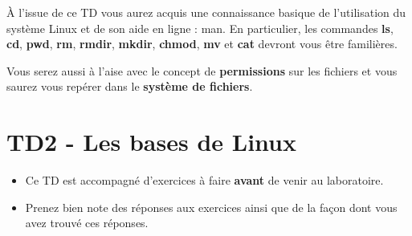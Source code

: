 \documentclass[a4paper,11pt]{article}
\date{2018 -- 2019}
\begin{document}
\entete
\titre
{}
\lastedit


	\begin{tcolorbox}[blanker,
	before skip=10mm,after skip=10mm,
	borderline west={1mm}{-4mm}{lightgray},
	title=Objectifs, coltitle=black, fonttitle=\sffamily\bfseries\large]
	\`A l'issue de ce TD vous aurez acquis une connaissance basique de l'utilisation du syst\`eme Linux 
	et de son aide en ligne : man.   
	En particulier, les commandes \textbf{ls}, 
	\textbf{cd}, \textbf{pwd}, 
	\textbf{rm}, \textbf{rmdir}, 
	\textbf{mkdir}, \textbf{chmod}, 
	\textbf{mv} et \textbf{cat} 
	devront vous \^etre famili\`eres.  
	
	\par
	
	Vous serez aussi \`a l'aise avec le concept de \textbf{permissions} 
	sur les fichiers et vous saurez vous rep\'erer dans le \textbf{syst\`eme de fichiers}. 

	\end{tcolorbox}
	
	\tableofcontents

	\newpage

\section{TD2 - Les bases de Linux}%
\begin{consigne}
\begin{itemize}
	\item Ce TD est accompagn\'e d'exercices \`a faire \textbf{avant} de venir au laboratoire.
\item Prenez bien note des r\'eponses aux exercices ainsi que de la fa\c con dont vous avez trouv\'e ces r\'eponses.

%
\end{itemize}
\end{consigne}
\end{document}
